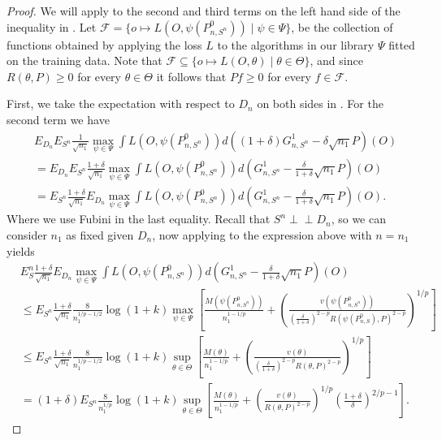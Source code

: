 \documentclass[11pt, a4paper]{article}
\theoremstyle{definition}
\theoremstyle{remark}
\newcommand{\indep}{\perp \!\!\! \perp}
\newcommand{\btheta}{\theta}
\newcommand{\la}{\psi}
\newcommand{\Sn}{S^n}
\newcommand{\lib}{\Psi}
\begin{document}
\begin{proof}[Proof]
    We will apply  to the second and third terms on the left hand side of the inequality in . Let $ \mathcal{F} = \{o \mapsto L(O, \la(P_{n,\Sn}^{0})) \mid \la \in \lib\}$, be the collection of functions obtained by applying the loss $ L $ to the algorithms in our library $ \lib$ fitted on the training data. Note that $ \mathcal{F} \subseteq \{o \mapsto L(O, \btheta) \mid \btheta \in \Theta\} $, and since $ R(\btheta, P) \geq 0 $ for every $ \btheta \in \Theta $ it follows that $ Pf \geq 0 $ for every $ f \in \mathcal{F} $.

First, we take the expectation with respect to $ D_n $ on both sides in . For the second term we have 
\begin{align*}
&E_{D_n} E_{\Sn} \frac{1}{\sqrt{n_1} } \max_{\la \in \lib} \int L(O, \la(P_{n, \Sn}^{0})) d ((1 + \delta) G_{n,\Sn}^{1} - \delta \sqrt{n_1} P)(O)\\
&= 
E_{D_n}E_{\Sn} \frac{1 + \delta}{\sqrt{n_1} } \max_{\la \in \lib} \int L(O, \la(P_{n, \Sn}^{0})) d (G_{n,\Sn}^{1} - \frac{\delta }{1 + \delta} \sqrt{n_1} P)(O)\\
&=E_{\Sn} \frac{1 + \delta}{\sqrt{n_1} } E_{D_n}\max_{\la \in \lib} \int L(O, \la(P_{n, \Sn}^{0})) d (G_{n,\Sn}^{1} - \frac{\delta }{1 + \delta} \sqrt{n_1} P)(O).
\end{align*}
Where we use Fubini in the last equality. Recall that $ \Sn \indep D_n $, so we can consider $ n_1 $ as fixed given $ D_n $, now applying  to the expression above with $ n = n_1 $ yields 
\begin{align*}
&E_\Sn\frac{1 + \delta}{\sqrt{n_1} } E_{D_n} \max_{\la \in \lib} \int L(O, \la(P_{n, \Sn}^{0})) d (G_{n,\Sn}^{1} - \frac{\delta }{1 + \delta} \sqrt{n_1} P)(O) \\
&\leq E_{\Sn} \frac{1 + \delta}{\sqrt{n_1}} \frac{8}{n_1^{1/p-1/2}} \log(1 + k) \max_{\la \in \lib} \left[ \frac{M(\la(P_{n,\Sn}^{0}))}{n_1^{1-1/p}} + \left( \frac{v(\la(P_{n,\Sn}^0) )}{( \frac{\delta}{1 + \delta} )^{2-p} R(\la(P_{n,S}^{0}), P)^{2-p}} \right)^{1/p} \right] \\
&\leq E_{\Sn}\frac{1 + \delta}{\sqrt{n_1}} \frac{8}{n_1^{1/p-1/2}} \log(1 + k) \sup_{\btheta \in \Theta} \left[ \frac{M(\btheta)}{n_1^{1-1/p}} + \left( \frac{v(\btheta)}{( \frac{\delta}{1 + \delta} )^{2-p} R(\btheta,P)^{2-p}} \right)^{1/p} \right] \\
&= (1 + \delta) E_{\Sn}\frac{8}{n_1^{1/p}} \log(1 + k) \sup_{\btheta \in \Theta} \left[ \frac{M(\btheta)}{n_1^{1-1/p}} + \left( \frac{v(\btheta)}{R(\btheta,P)^{2-p}} \right)^{1/p}\left( \frac{1 + \delta}{\delta}  \right)^{2/p-1} \right].  

\end{align*}
\end{proof}
\end{document}
